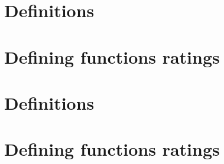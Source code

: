 
\section*{Definitions}

\vfill
\section*{Defining functions ratings}

\vfill
\section*{Definitions}

\vfill
\section*{Defining functions ratings}

\vfill
